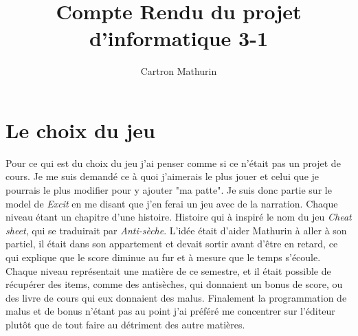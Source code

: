 \documentclass[10pt,a4paper]{article}
\author{Cartron Mathurin}
\title{Compte Rendu du projet d'informatique 3-1}
\begin{document}
\maketitle
\tableofcontents

\section{Le choix du jeu}
Pour ce qui est du choix du jeu j'ai penser comme si ce n'était pas un projet de cours. Je me suis demandé ce à quoi j'aimerais le plus jouer et celui que je pourrais le plus modifier pour y ajouter "ma patte". Je suis donc partie sur le model de \textit{Excit} en me disant que j'en ferai un jeu avec de la narration. Chaque niveau étant un chapitre d'une histoire. Histoire qui à inspiré le nom du jeu \textit{Cheat sheet}, qui se traduirait par \textit{Anti-sèche}. L'idée était d'aider Mathurin à aller à son partiel, il était dans son appartement et devait sortir avant d'être en retard, ce qui explique que le score diminue au fur et à mesure que le temps s'écoule. Chaque niveau représentait une matière de ce semestre, et il était possible de récupérer des items, comme des antisèches, qui donnaient un bonus de score, ou des livre de cours qui eux donnaient des malus. Finalement la programmation de malus et de bonus n'étant pas au point j'ai préféré me concentrer sur l'éditeur plutôt que de tout faire au détriment des autre matières.
\end{document}
